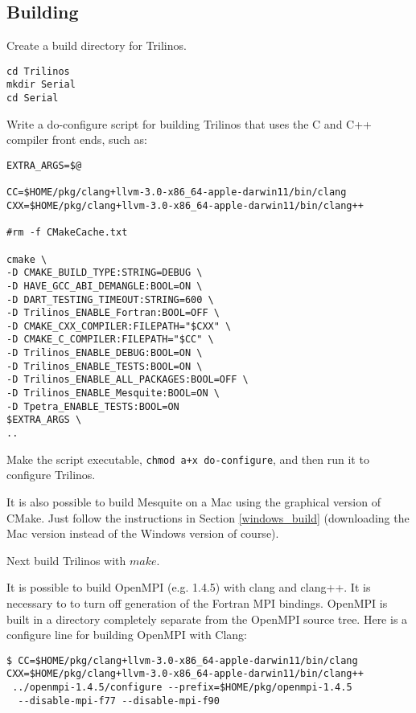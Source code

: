 \subsection{Building}
Create a build directory for Trilinos.
\begin{verbatim}
cd Trilinos
mkdir Serial
cd Serial
\end{verbatim}
Write a do-configure script for building Trilinos that uses the C and C++ compiler front ends, such as:
\begin{verbatim}
EXTRA_ARGS=$@

CC=$HOME/pkg/clang+llvm-3.0-x86_64-apple-darwin11/bin/clang
CXX=$HOME/pkg/clang+llvm-3.0-x86_64-apple-darwin11/bin/clang++

#rm -f CMakeCache.txt

cmake \
-D CMAKE_BUILD_TYPE:STRING=DEBUG \
-D HAVE_GCC_ABI_DEMANGLE:BOOL=ON \
-D DART_TESTING_TIMEOUT:STRING=600 \
-D Trilinos_ENABLE_Fortran:BOOL=OFF \
-D CMAKE_CXX_COMPILER:FILEPATH="$CXX" \
-D CMAKE_C_COMPILER:FILEPATH="$CC" \
-D Trilinos_ENABLE_DEBUG:BOOL=ON \
-D Trilinos_ENABLE_TESTS:BOOL=ON \
-D Trilinos_ENABLE_ALL_PACKAGES:BOOL=OFF \
-D Trilinos_ENABLE_Mesquite:BOOL=ON \
-D Tpetra_ENABLE_TESTS:BOOL=ON 
$EXTRA_ARGS \
..
\end{verbatim}
Make the script executable, {\tt chmod a+x do-configure}, and then run it to configure Trilinos.

It is also possible to build Mesquite on a Mac using the graphical version of CMake. Just follow the instructions in Section \ref{windows_build} (downloading the Mac version instead of the Windows version of course).

Next build Trilinos with $make$.

It is possible to build OpenMPI (e.g. 1.4.5) with clang and clang++.  It is necessary to to turn off generation of the Fortran MPI bindings.  
OpenMPI is built in a directory completely separate from the OpenMPI source tree.
 Here is a configure line for building OpenMPI with Clang:
 \begin{verbatim}
$ CC=$HOME/pkg/clang+llvm-3.0-x86_64-apple-darwin11/bin/clang 
CXX=$HOME/pkg/clang+llvm-3.0-x86_64-apple-darwin11/bin/clang++
 ../openmpi-1.4.5/configure --prefix=$HOME/pkg/openmpi-1.4.5
  --disable-mpi-f77 --disable-mpi-f90
\end{verbatim}




